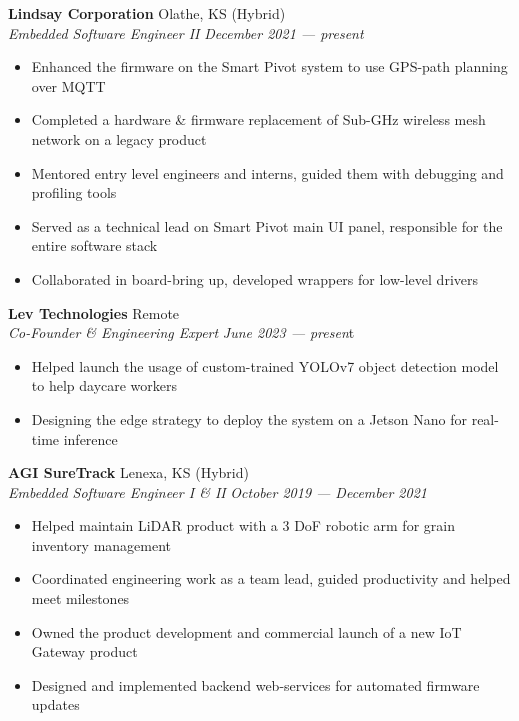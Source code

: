 \documentclass[a4paper]{article}
\begin{document}
\textbf{Lindsay Corporation} \hfill Olathe, KS (Hybrid)\\
\textit{Embedded Software Engineer II} \hfill \textit{December 2021 --- present}\\
\vspace{-1mm}
\begin{itemize} \itemsep 1pt
    \item Enhanced the firmware on the Smart Pivot system to use GPS-path planning over MQTT
    \item Completed a hardware \& firmware replacement of Sub-GHz wireless mesh network on a legacy product
    \item Mentored entry level engineers and interns, guided them with debugging and profiling tools
    \item Served as a technical lead on Smart Pivot main UI panel, responsible for the entire software stack
    \item Collaborated in board-bring up, developed wrappers for low-level drivers
\end{itemize}
\textbf{Lev Technologies} \hfill Remote\\
\textit{Co-Founder \& Engineering Expert} \hfill \textit{June 2023 --- presen}t\\
\vspace{-1mm}
\begin{itemize} \itemsep 1pt
    \item Helped launch the usage of custom-trained YOLOv7 object detection model to help daycare workers
    \item Designing the edge strategy to deploy the system on a Jetson Nano for real-time inference
\end{itemize}
\textbf{AGI SureTrack} \hfill Lenexa, KS (Hybrid)\\
\textit{Embedded Software Engineer I \& II} \hfill \textit{October 2019 --- December 2021}\\
\vspace{-1mm}
\begin{itemize} \itemsep 1pt
	\item Helped maintain LiDAR product with a 3 DoF robotic arm for grain inventory management
	\item Coordinated engineering work as a team lead, guided productivity and helped meet milestones
	\item Owned the product development and commercial launch of a new IoT Gateway product
	\item Designed and implemented backend web-services for automated firmware updates
\end{itemize}
\end{document}
